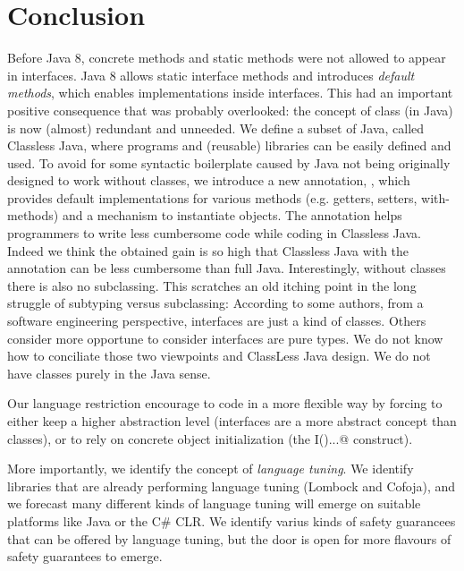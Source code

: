\section{Conclusion}\label{sec:conclusion}

Before Java 8, concrete methods and static methods were not allowed
to appear in interfaces.  Java 8 allows static interface methods and
introduces \emph{default methods}, which enables implementations
inside interfaces. This had an important positive consequence that
was probably overlooked: the concept of class
(in Java) is now (almost) redundant and unneeded.  We define a subset of Java,
called Classless Java, where programs and (reusable) libraries can be
easily defined and used.  To avoid for some syntactic boilerplate
caused by Java not being originally designed to work without classes,
we introduce a new annotation, \mixin, which provides default implementations
for various methods (e.g. getters, setters, with-methods) and a
mechanism to instantiate objects. The \mixin annotation helps programmers
to write less cumbersome code while coding in Classless Java. Indeed
we think the obtained gain is so high that Classless Java with the \mixin
annotation can be less cumbersome than full Java.
Interestingly, without classes there is also no subclassing. This scratches an old
  itching point in the long struggle of subtyping versus subclassing:
  According to some authors, from a software engineering perspective,
  interfaces are just a kind of classes. Others consider more
  opportune to consider interfaces are pure types. We do not know how to conciliate
  those two viewpoints and ClassLess Java design.
  We do not have classes purely in the Java sense.
  
 Our language restriction encourage to code in a more flexible way by forcing to either keep a higher
 abstraction level (interfaces are a more abstract concept than classes), or to rely on
 concrete object initialization (the \Q@new I(){...}@ construct).
 
 More importantly, we identify the concept of \emph{language tuning}.
 We identify libraries that are already performing language tuning (Lombock and Cofoja), and 
 we forecast many different kinds of language tuning will emerge on suitable platforms like Java or the C\# CLR.
 We identify varius kinds of safety guarancees that can be offered by language tuning, but the door is open for more flavours of safety guarantees to emerge.